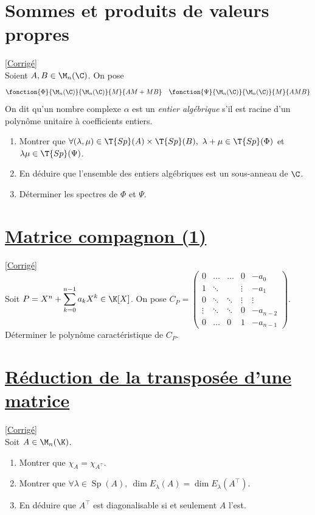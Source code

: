 \documentclass[8pt]{book}
\begin{document}
	\section{Sommes et produits de valeurs propres}
	\label{Sommes et produits de valeurs propres}
	\textcolor{blue}{\hyperref[Sommes et produits de valeurs propres corrigé]{[Corrigé]}}\\
	Soient $A,B\in \M_n(\C)$. On pose
	$$\fonction{\Phi}{\M_n(\C)}{\M_n(\C)}{M}{AM+MB}\quad\fonction{\Psi}{\M_n(\C)}{\M_n(\C)}{M}{AMB}$$
	On dit qu'un nombre complexe $\alpha$ est un \textit{entier algébrique} s'il est racine d'un polynôme unitaire à coefficients entiers.
	\begin{enumerate}
		\item Montrer que $\forall (\lambda,\mu)\in \T{Sp}(A)\times \T{Sp}(B),\ \lambda+\mu\in \T{Sp}(\Phi)$ et $\lambda\mu\in \T{Sp}(\Psi)$.
		\item En déduire que l'ensemble des entiers algébriques est un sous-anneau de $\C$.
		\item Déterminer les spectres de $\Phi$ et $\Psi$.
	\end{enumerate}
	
	\section{\underline{Matrice compagnon (1)} }
	\label{Matrice compagnon (1)}
	\textcolor{blue}{\hyperref[Matrice compagnon (1) corrigé]{[Corrigé]}}\\
	Soit $P=X^n+\displaystyle\sum\limits_{k=0}^{n-1}{a_kX^k}\in \K[X]$. On pose $C_P=
	\begin{pmatrix}
		0&\dots&\dots&0&-a_0\\
		1&\ddots&\ &\vdots&-a_1\\
		0&\ddots&\ddots&\vdots&\vdots\\
		\vdots&\ddots&\ddots&0&-a_{n-2}\\
		0&\dots&0&1&-a_{n-1}
	\end{pmatrix}$.\\
	Déterminer le polynôme caractéristique de $C_P$.
	
	\section{\underline{Réduction de la transposée d'une matrice} }
	\label{Réduction de la transposée d'une matrice}
	\textcolor{blue}{\hyperref[Réduction de la transposée d'une matrice corrigé]{[Corrigé]}}\\
	Soit $A\in \M_n(\K)$.
	\begin{enumerate}
		\item Montrer que $\chi_{A}=\chi_{A^\top}$.
		\item Montrer que $\forall \lambda \in \operatorname{Sp}(A),\ \dim{E_\lambda(A)}=\dim{E_\lambda(A^\top)}$.
		\item En déduire que $A^\top$ est diagonalisable si et seulement $A$ l'est.
	\end{enumerate}
	
\end{document}
